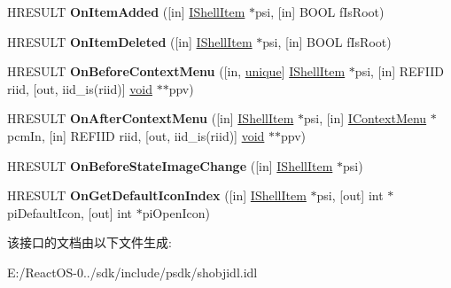 \begin{DoxyCompactItemize}
H\+R\+E\+S\+U\+LT {\bfseries On\+Item\+Added} (\mbox{[}in\mbox{]} \hyperlink{interface_i_shell_item}{I\+Shell\+Item} $\ast$psi, \mbox{[}in\mbox{]} B\+O\+OL f\+Is\+Root)
\item 
\mbox{\label{interface_i_name_space_tree_control_events_a0df0837c087d5ff554b2043adc1a97f9}} 
H\+R\+E\+S\+U\+LT {\bfseries On\+Item\+Deleted} (\mbox{[}in\mbox{]} \hyperlink{interface_i_shell_item}{I\+Shell\+Item} $\ast$psi, \mbox{[}in\mbox{]} B\+O\+OL f\+Is\+Root)
\item 
\mbox{\label{interface_i_name_space_tree_control_events_a93bba7eedf40ef05286e46664470cb61}} 
H\+R\+E\+S\+U\+LT {\bfseries On\+Before\+Context\+Menu} (\mbox{[}in, \hyperlink{interfaceunique}{unique}\mbox{]} \hyperlink{interface_i_shell_item}{I\+Shell\+Item} $\ast$psi, \mbox{[}in\mbox{]} R\+E\+F\+I\+ID riid, \mbox{[}out, iid\+\_\+is(riid)\mbox{]} \hyperlink{interfacevoid}{void} $\ast$$\ast$ppv)
\item 
\mbox{\label{interface_i_name_space_tree_control_events_af8ca1aece4bb7a6193688128ea09615e}} 
H\+R\+E\+S\+U\+LT {\bfseries On\+After\+Context\+Menu} (\mbox{[}in\mbox{]} \hyperlink{interface_i_shell_item}{I\+Shell\+Item} $\ast$psi, \mbox{[}in\mbox{]} \hyperlink{interface_i_context_menu}{I\+Context\+Menu} $\ast$pcm\+In, \mbox{[}in\mbox{]} R\+E\+F\+I\+ID riid, \mbox{[}out, iid\+\_\+is(riid)\mbox{]} \hyperlink{interfacevoid}{void} $\ast$$\ast$ppv)
\item 
\mbox{\label{interface_i_name_space_tree_control_events_a3a726e95300c41185ee077fb0a907f25}} 
H\+R\+E\+S\+U\+LT {\bfseries On\+Before\+State\+Image\+Change} (\mbox{[}in\mbox{]} \hyperlink{interface_i_shell_item}{I\+Shell\+Item} $\ast$psi)
\item 
\mbox{\label{interface_i_name_space_tree_control_events_a78218dceb11292646e0a44a59648b873}} 
H\+R\+E\+S\+U\+LT {\bfseries On\+Get\+Default\+Icon\+Index} (\mbox{[}in\mbox{]} \hyperlink{interface_i_shell_item}{I\+Shell\+Item} $\ast$psi, \mbox{[}out\mbox{]} int $\ast$pi\+Default\+Icon, \mbox{[}out\mbox{]} int $\ast$pi\+Open\+Icon)
\end{DoxyCompactItemize}


该接口的文档由以下文件生成\+:\begin{DoxyCompactItemize}
\item 
E\+:/\+React\+O\+S-\/0../sdk/include/psdk/shobjidl.\+idl\end{DoxyCompactItemize}
